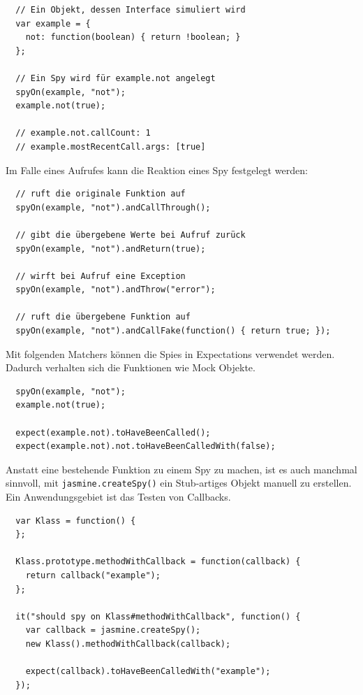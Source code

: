 \documentclass[11pt, a4paper]{article}
\begin{document}
\begin{verbatim}
  // Ein Objekt, dessen Interface simuliert wird
  var example = {
    not: function(boolean) { return !boolean; }
  };

  // Ein Spy wird für example.not angelegt
  spyOn(example, "not");
  example.not(true);

  // example.not.callCount: 1
  // example.mostRecentCall.args: [true]
\end{verbatim}

Im Falle eines Aufrufes kann die Reaktion eines Spy festgelegt werden:

\begin{verbatim}
  // ruft die originale Funktion auf
  spyOn(example, "not").andCallThrough();

  // gibt die übergebene Werte bei Aufruf zurück
  spyOn(example, "not").andReturn(true);

  // wirft bei Aufruf eine Exception
  spyOn(example, "not").andThrow("error");

  // ruft die übergebene Funktion auf
  spyOn(example, "not").andCallFake(function() { return true; });
\end{verbatim}

Mit folgenden Matchers können die Spies in Expectations verwendet werden.
Dadurch verhalten sich die Funktionen wie Mock Objekte.

\begin{verbatim}
  spyOn(example, "not");
  example.not(true);

  expect(example.not).toHaveBeenCalled();
  expect(example.not).not.toHaveBeenCalledWith(false);
\end{verbatim}

\clearpage

Anstatt eine bestehende Funktion zu einem Spy zu machen, ist es auch manchmal
sinnvoll, mit \texttt{jasmine.createSpy()} ein Stub-artiges Objekt manuell zu erstellen.
Ein Anwendungsgebiet ist das Testen von Callbacks\cite{jasmine_jasmine_2011-1}.

\begin{verbatim}
  var Klass = function() {
  };

  Klass.prototype.methodWithCallback = function(callback) {
    return callback("example");
  };

  it("should spy on Klass#methodWithCallback", function() {
    var callback = jasmine.createSpy();
    new Klass().methodWithCallback(callback);

    expect(callback).toHaveBeenCalledWith("example");
  });
\end{verbatim}
\end{document}
